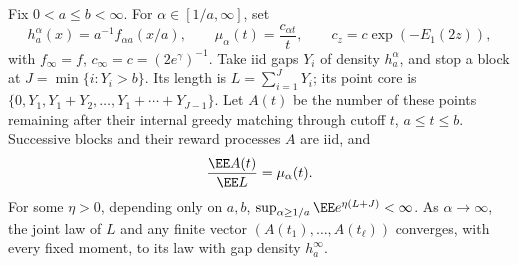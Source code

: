\documentclass[11pt,letterpaper]{article}
\begin{document}
\begin{lemma}
\label{lem:temporal-renewal-blocks}
Fix $0<a\le b<\infty$. For $\alpha\in[1/a,\infty]$, set
\[
 h_a^\alpha(x)=a^{-1}f_{\alpha a}(x/a),\qquad
 \mu_\alpha(t)=\frac{c_{\alpha t}}t,
 \qquad c_z=c\exp(-E_1(2z)),
\]
with $f_\infty=f$, $c_\infty=c=(2e^\gamma)^{-1}$.
Take iid gaps $Y_i$ of density $h_a^\alpha$, and stop a block at
$J=\min\{i:Y_i>b\}$. Its length is $L=\sum_{i=1}^JY_i$;
its point core is
$\{0,Y_1,Y_1+Y_2,\ldots,Y_1+\cdots+Y_{J-1}\}$.
Let $A(t)$ be the number of these points remaining after their
internal greedy matching through cutoff $t$, $a\le t\le b$.
Successive blocks and their reward processes $A$ are iid, and
\begin{equation}\label{eq:temporal-block-mean}
 \frac{\EE A(t)}{\EE L}=\mu_\alpha(t).
\end{equation}
For some $\eta>0$, depending only on $a,b$,
$\sup_{\alpha\ge1/a}\EE e^{\eta(L+J)}<\infty$.
As $\alpha\to\infty$, the joint law of $L$ and any finite vector
$(A(t_1),\ldots,A(t_\ell))$ converges, with every fixed moment,
to its law with gap density $h_a^\infty$.
\end{lemma}
\end{document}
